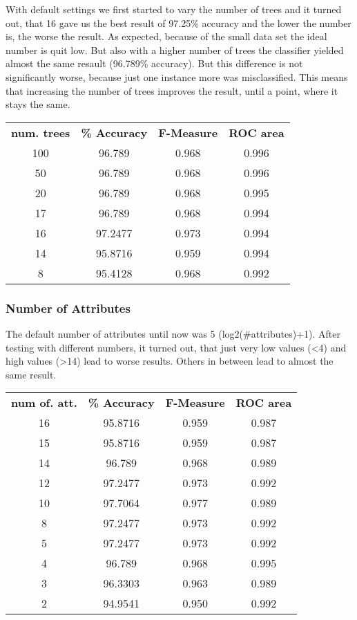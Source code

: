 \documentclass{article}
\begin{document}
With default settings we first started to vary the number of trees and it turned out, that 16 gave us the best result of 97.25\% accuracy and the lower the number is, the worse the result. As expected, because of the small data set the ideal number is quit low. But also with a higher number of trees the classifier yielded almost the same resault (96.789\% accuracy). But this difference is not significantly worse, because just one instance more was misclassified. This means that increasing the number of trees improves the result, until a point, where it stays the same.
 
\begin{center}
\begin{tabular}{ c | c | c | c }
\textbf{num. trees} & \textbf{\% Accuracy} & \textbf{F-Measure} & \textbf{ROC area} \\
100 & 96.789 & 0.968 & 0.996 \\
50 & 96.789 & 0.968 &  0.996 \\
20 & 96.789 & 0.968 & 0.995 \\
17 & 96.789 & 0.968 & 0.994 \\
16 & 97.2477 & 0.973 & 0.994 \\
14 & 95.8716 & 0.959 & 0.994 \\
8 & 95.4128 & 0.968 & 0.992 \\
\end{tabular}
\end{center}
 
\subsubsection{Number of Attributes}
 
The default number of attributes until now was 5 (log2(\#attributes)+1). After testing with different numbers, it turned out, that just very low values (<4) and high values (>14) lead to worse results. Others in between lead to almost the same result.
 
\begin{center}
\begin{tabular}{ c | c | c | c }
\textbf{num of. att.} & \textbf{\% Accuracy} & \textbf{F-Measure} & \textbf{ROC area}\\
16 & 95.8716 & 0.959 & 0.987  \\
15 & 95.8716 & 0.959 & 0.987 \\
14 & 96.789 &  0.968 & 0.989 \\
12 & 97.2477 & 0.973 & 0.992 \\
10 & 97.7064 & 0.977 & 0.989 \\
8 & 97.2477 & 0.973 & 0.992 \\
5 & 97.2477 & 0.973 & 0.992 \\
4 & 96.789 & 0.968 & 0.995 \\
3 & 96.3303 & 0.963 & 0.989 \\
2 & 94.9541 & 0.950 & 0.992 \\
\end{tabular}
\end{center} 
\end{document}
